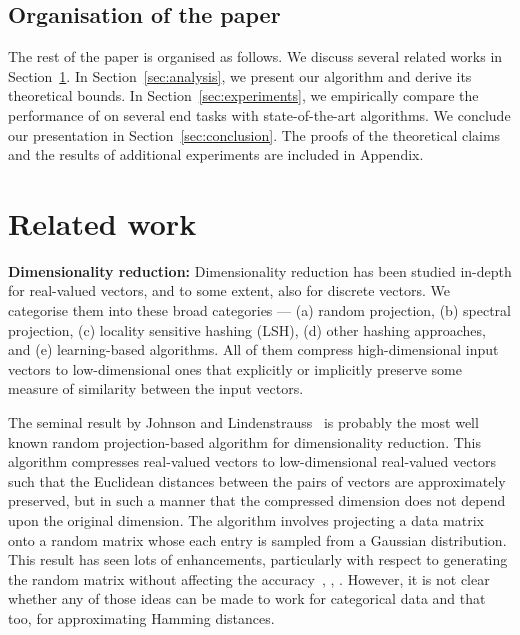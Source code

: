 \subsection{Organisation of the paper}
The rest of the paper is organised as follows. We discuss several related works in Section~\ref{sec:relwork}.
In Section~\ref{sec:analysis}, we present our algorithm \fsketch and derive its theoretical bounds. In Section~\ref{sec:experiments}, we empirically compare the performance of \fsketch on several end tasks with state-of-the-art algorithms. We conclude our presentation in Section~\ref{sec:conclusion}.
The proofs of the theoretical claims and the results of additional experiments are included in Appendix.

\section{Related work} \label{sec:relwork}
{\bf Dimensionality reduction:} 
Dimensionality reduction has been studied in-depth for real-valued vectors, and to some extent, also for discrete vectors. We categorise them into these broad categories --- (a) random projection, (b) spectral projection, (c) locality sensitive hashing (LSH), (d) other hashing approaches, and (e) learning-based algorithms. All of them compress high-dimensional input vectors to low-dimensional ones that explicitly or implicitly preserve some measure of similarity between the input vectors.

The seminal result by Johnson and Lindenstrauss~\cite{JL83} is probably the most well known random projection-based algorithm for dimensionality reduction. This algorithm compresses real-valued vectors to low-dimensional real-valued vectors such that the Euclidean distances between the pairs of vectors are approximately  preserved, but in such a manner that the compressed dimension does not depend upon the original dimension. The algorithm involves projecting a data matrix onto a random matrix whose each entry is sampled from a Gaussian distribution. This result has seen lots of enhancements, particularly with respect to generating the random matrix without affecting the accuracy~\cite{Achlioptas03}, \cite{LiHC06}, \cite{KaneN14}. However, it is not clear whether any of those ideas can be made to work for categorical data and that too, for approximating Hamming distances.

